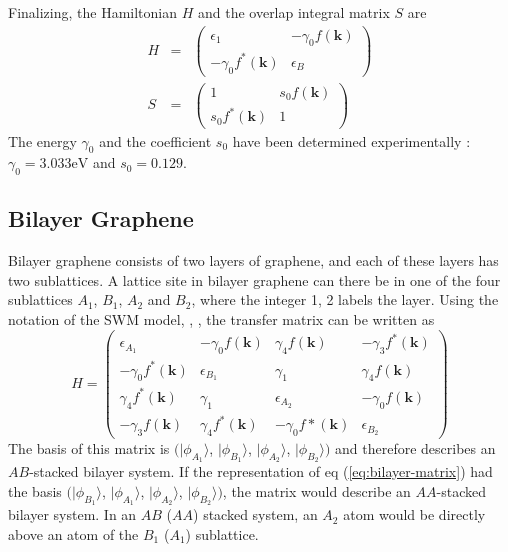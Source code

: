 Finalizing, the Hamiltonian $H$ and the overlap integral matrix $S$ are
\begin{eqnarray}
H &=& \begin{pmatrix} \epsilon_1 & - \gamma_0 f \left( \mathbf{k} \right) \\ - \gamma_0 f^* \left( \mathbf{k} \right) & \epsilon_B \end{pmatrix} \\
S &=& \begin{pmatrix} 1 & s_0 f \left( \mathbf{k} \right) \\ s_0 f^* \left( \mathbf{k} \right) & 1 \end{pmatrix}
\end{eqnarray}
The energy $\gamma_0$ and the coefficient $s_0$ have been determined experimentally \cite{Dresselhaus1995}:
$\gamma_0 = 3.033 \text{eV}$ and $s_0 = 0.129$.

\subsection{Bilayer Graphene}
Bilayer graphene consists of two layers of graphene, and each of these layers has two sublattices. A lattice site in bilayer graphene can there be in one of the four sublattices $A_1$, $B_1$, $A_2$ and $B_2$, where the integer 1, 2 labels the layer. Using the notation of the SWM model, \cite{McClure1957}, \cite{McClure1960}, the transfer matrix can be written as
\begin{equation}
H =  \begin{pmatrix} \epsilon_{A_1} & - \gamma_0 f \left( \mathbf{k} \right) & \gamma_4 f \left( \mathbf{k} \right) & - \gamma_3 f^*\left( \mathbf{k} \right) \\
- \gamma_0 f^* \left( \mathbf{k} \right) & \epsilon_{B_1} & \gamma_1 & \gamma_4 f \left( \mathbf{k} \right) \\
\gamma_4 f^* \left( \mathbf{k} \right) & \gamma_1 & \epsilon_{A_2} & - \gamma_0 f \left( \mathbf{k} \right)  \\
- \gamma_3 f \left( \mathbf{k} \right) & \gamma_4 f^* \left( \mathbf{k} \right)& -\gamma_0 f* \left( \mathbf{k} \right)& \epsilon_{B_2} \end{pmatrix} \label{eq:bilayer-matrix}
\end{equation}
The basis  of this matrix is  $( |\phi_{A_1}\rangle$, $|\phi_{B_1}\rangle$, $|\phi_{A_2}\rangle$, $|\phi_{B_2}\rangle )$ and therefore describes an $AB$-stacked bilayer system. If the representation of eq (\ref{eq:bilayer-matrix}) had the basis $( |\phi_{B_1}\rangle$, $|\phi_{A_1}\rangle$, $|\phi_{A_2}\rangle$, $|\phi_{B_2}\rangle )$, the matrix would describe an $AA$-stacked bilayer system. %
In an $AB$ ($AA$) stacked system, an $A_2$ atom would be directly above an atom of the $B_1$ ($A_1$) sublattice.

